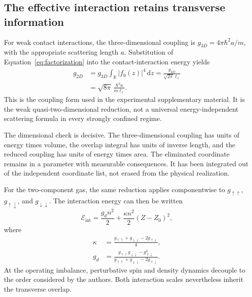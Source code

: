 \documentclass[11pt,a4paper]{article}
\theoremstyle{definition}
\theoremstyle{remark}
\newcommand{\dd}{\mathrm{d}}
\newcommand{\R}{\mathbb{R}}
\newcommand{\lop}{\ell_z}
\begin{document}
\subsection{The effective interaction retains transverse information}
For weak contact interactions, the three-dimensional coupling is $g_{3D}=4\pi\hbar^2a/m$, with the appropriate scattering length $a$. Substitution of Equation~\eqref{eq:factorization} into the contact-interaction energy yields
\begin{align}
 g_{2D}&=g_{3D}\int_{\R}|f_0(z)|^4\,\dd z
       =\frac{g_{3D}}{\sqrt{2\pi}\lop}\nonumber\\
       &=\sqrt{8\pi}\,\frac{\hbar^2a}{m\lop}.
 \label{eq:g2d}
\end{align}
This is the coupling form used in the experimental supplementary material. It is the weak quasi-two-dimensional reduction, not a universal energy-independent scattering formula in every strongly confined regime.\cite{zhang2026,hadzibabic,petrov}

The dimensional check is decisive. The three-dimensional coupling has units of energy times volume, the overlap integral has units of inverse length, and the reduced coupling has units of energy times area. The eliminated coordinate remains in a parameter with measurable consequences. It has been integrated out of the independent coordinate list, not erased from the physical realization.

For the two-component gas, the same reduction applies componentwise to $g_{\uparrow\uparrow}$, $g_{\uparrow\downarrow}$, and $g_{\downarrow\downarrow}$. The interaction energy can then be written
\begin{equation}
 \mathcal E_{\mathrm{int}}
 =\frac{g_dn^2}{2}+\frac{\kappa n^2}{2}(Z-Z_0)^2,
 \label{eq:interaction}
\end{equation}
where
\begin{align}
 \kappa&=\frac{g_{\uparrow\uparrow}+g_{\downarrow\downarrow}
                   -2g_{\uparrow\downarrow}}{4},\nonumber\\
 g_d&=\frac{g_{\uparrow\uparrow}g_{\downarrow\downarrow}
                   -g_{\uparrow\downarrow}^2}
                  {g_{\uparrow\uparrow}+g_{\downarrow\downarrow}
                   -2g_{\uparrow\downarrow}}.
 \label{eq:kappa}
\end{align}
At the operating imbalance, perturbative spin and density dynamics decouple to the order considered by the authors. Both interaction scales nevertheless inherit the transverse overlap.\cite{zhang2026}
\end{document}
